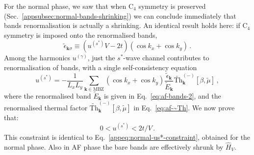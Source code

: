 For the normal phase, we saw that when $\mathrm{C}_4$ symmetry is preserved (Sec.~\ref{appsubsec:normal-bands-shrinking}) we can conclude immediately that bands renormalisation is actually a shrinking. An identical result holds here: if $\mathrm{C}_4$ symmetry is imposed onto the renormalised bands,
\[
	\tilde{\epsilon}_{\mathbf{k}\sigma} \equiv (u^{(s^*)} V - 2t) (\cos k_x + \cos k_y) \, .
\]
Among the harmonics $u^{(\gamma)}$, just the $s^*$-wave channel contributes to renormalisation of bands, with a single self-consistency equation
\begin{equation}\label{appeq:af-uS-sceq}
	u^{(s^*)} = - \frac{1}{L_x L_y} \sum_{\mathbf{k}\in\mathrm{MBZ}} (\cos k_x + \cos k_y) \frac{\tilde{\epsilon}_\mathbf{k}}{\tilde{E}_\mathbf{k}} \tilde{\mathrm{Th}}_\mathbf{k}^{(-)}[\beta,\tilde{\mu}] \, ,
\end{equation}
where the renormalised band $\tilde{E}_\mathbf{k}$ is given in Eq.~\eqref{eq:af-bands-2}, and the renormalised thermal factor $\tilde{\mathrm{Th}}_\mathbf{k}^{(-)}[\beta,\tilde{\mu}]$ in Eq.~\eqref{eq:af-~Th}. We now prove that:
\begin{equation}\label{appeq:af-us*-constraint}
	0 < u^{(s^*)} < 2t/V \, .
\end{equation}
This constraint is identical to Eq.~\eqref{appeq:normal-us*-constraint}, obtained for the normal phase. Also in AF phase the bare bands are effectively shrunk by $\hat H_V$.

